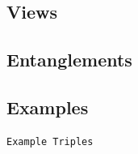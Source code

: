 \subsection{Views}
\label{ssec:views}


\subsection{Entanglements}
\label{ssec:entanglements}


\subsection{Examples}
\label{ssec:examples}
\begin{verbatim}
Example Triples
\end{verbatim}

